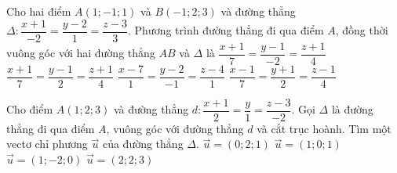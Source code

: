 \begin{ex}%
	Cho hai điểm $A(1;-1;1)$ và $B(-1;2;3)$ và đường thẳng $\Delta\colon\dfrac{x+1}{-2}=\dfrac{y-2}{1}=\dfrac{z-3}{3}$. Phương trình đường thẳng đi qua điểm $A$, đồng thời vuông góc với hai đường thẳng $AB$ và $\Delta$ là
	\choice
	{$\dfrac{x+1}{7}=\dfrac{y-1}{-2}=\dfrac{z+1}{4}$}
	{$\dfrac{x+1}{7}=\dfrac{y-1}{2}=\dfrac{z+1}{4}$}
	{$\dfrac{x-7}{1}=\dfrac{y-2}{-1}=\dfrac{z-4}{1}$}
	{\True $\dfrac{x-1}{7}=\dfrac{y+1}{2}=\dfrac{z-1}{4}$}
\end{ex}

\begin{ex}
	Cho điểm $A(1;2;3)$ và đường thẳng $d: \dfrac{x+1}{2}=\dfrac{y}{1}=\dfrac{z-3}{-2}$. Gọi $\Delta$ là đường thẳng đi qua điểm $A$, vuông góc với đường thẳng $d$ và cắt trục hoành. Tìm một vectơ chỉ phương $\overrightarrow{u}$ của đường thẳng $\Delta$.
	\choice
	{$\overrightarrow{u}=(0;2;1)$}
	{$\overrightarrow{u}=(1;0;1)$}
	{$\overrightarrow{u}=(1;-2;0)$}
	{\True $\overrightarrow{u}=(2;2;3)$}
	\loigiai{
	}
\end{ex}

